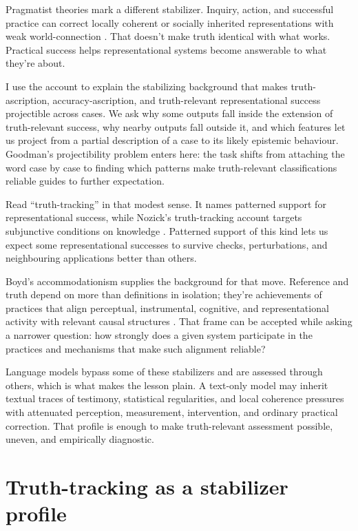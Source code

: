 \documentclass[12pt]{article}
\begin{document}
Pragmatist theories mark a different stabilizer. Inquiry, action, and successful
practice can correct locally coherent or socially inherited representations with weak
world-connection
\citep{james_1907_pragmatism,dewey_1941_propositions_warranted_assertibility_truth}.
That doesn't make truth identical with what works. Practical success helps
representational systems become answerable to what they're about.

I use the account to explain the stabilizing background that makes truth-ascription,
accuracy-ascription, and truth-relevant representational success projectible across
cases. We ask why some outputs fall inside the extension of truth-relevant success, why
nearby outputs fall outside it, and which features let us project from a partial
description of a case to its likely epistemic behaviour. Goodman's projectibility problem enters here:
the task shifts from attaching the word  case by case to finding
which patterns make truth-relevant classifications reliable guides to further
expectation.

Read \enquote{truth-tracking} in that modest sense. It names
patterned support for representational success, while Nozick's truth-tracking account
targets subjunctive conditions on knowledge \citep{nozick_1981_philosophical_explanations}.
Patterned support of this kind lets us expect some representational successes to survive checks,
perturbations, and neighbouring applications better than others.

Boyd's accommodationism supplies the background for that move. Reference and truth
depend on more than definitions in isolation; they're achievements of practices that
align perceptual, instrumental, cognitive, and representational activity with relevant
causal structures \citep{boyd_2019_rethinking_natural_kinds_reference_truth}. That frame
can be accepted while asking a narrower question: how strongly does a given system
participate in the practices and mechanisms that make such alignment reliable?

Language models bypass some of these stabilizers and are assessed through others, which
is what makes the lesson plain. A text-only model may inherit textual traces of testimony,
statistical regularities, and local coherence pressures with attenuated perception,
measurement, intervention, and ordinary practical correction. That profile is enough to
make truth-relevant assessment possible, uneven, and empirically diagnostic.

\section{Truth-tracking as a stabilizer profile}\label{sec:profile}
\end{document}
